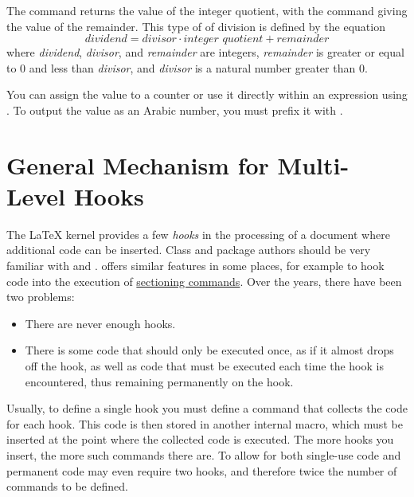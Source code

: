 \begin{Declaration}
\end{Declaration}%
The  command returns the
value of the integer quotient, with the  command giving the value
of the remainder. This type of of division is defined by the equation
\[
\textit{dividend} = \textit{divisor} \cdot
\textit{integer quotient} + \textit{remainder}
\]
where \textit{dividend}, \textit{divisor}, and \textit{remainder} are
integers, \textit{remainder} is greater or equal to 0 and less than
\textit{divisor}, and \textit{divisor} is a natural number greater than 0.

You can assign the value to a counter or use it directly within an expression
using . To output the value as an Arabic number, you must
prefix it with .%
%
\EndIndexGroup


\section[{General Mechanism for Multi-Level Hooks}]
{General Mechanism for Multi-Level
  Hooks}

\BeginIndexGroup
{}
The \LaTeX{} kernel provides a few \emph{hooks} in the processing of
a document where additional code can be inserted. Class and package authors
should be very familiar with  and
. \KOMAScript{} offers similar features in some places,
for example to hook code into the execution of 
\hyperref[sec:maincls.structure]{sectioning commands}. Over the years, there
have been two problems:
\begin{itemize}
  \item There are never enough hooks.
  \item There is some code that should only be executed once, as if it almost
  drops off the hook, as well as code that must be executed each time the
  hook is encountered, thus remaining permanently on the hook.
\end{itemize}
Usually, to define a single hook you must define a command that collects the
code for each hook. This code is then stored in another internal macro, which
must be inserted at the point where the collected code is executed. The more
hooks you insert, the more such commands there are. To allow for both
single-use code and permanent code may even require two hooks, and therefore
twice the number of commands to be defined.

